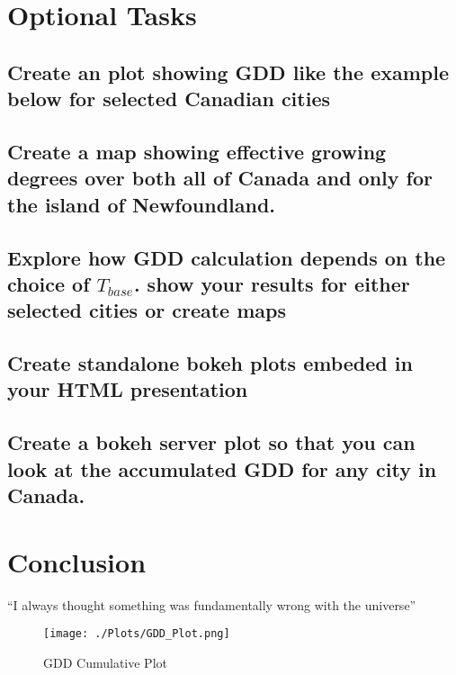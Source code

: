 \documentclass{article}
\begin{document}
\section{ \bf Optional Tasks}
\subsection{Create an plot showing GDD like the example below for selected Canadian cities}
\subsection{Create a map showing effective growing degrees over both all of Canada and only for the island of Newfoundland.}
\subsection{Explore how GDD calculation depends on the choice of $T_{base}$. show your results for either selected cities or create maps}
\subsection{Create standalone bokeh plots embeded in your HTML presentation}
\subsection{Create a bokeh server plot so that you can look at the accumulated GDD for any city in Canada.}



\section{Conclusion}
``I always thought something was fundamentally wrong with the universe''\citep{adams1995hitchhiker}




\begin{figure}[h!]
\centering
\texttt{[image: ./Plots/GDD\_Plot.png]}
\caption{GDD Cumulative Plot}
\label{fig: GDD Plot}
\end{figure}
\end{document}
